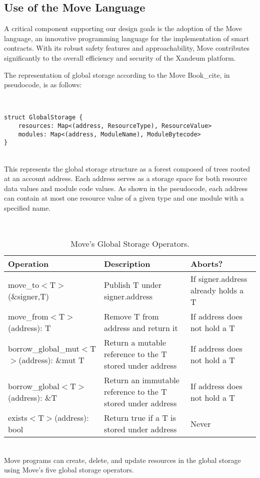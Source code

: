 \documentclass[11pt]{article}   	%
\begin{document}
\subsection{Use of the Move Language}
A critical component supporting our design goals is the adoption of the Move language, an innovative programming language for the implementation of smart contracts. With its robust safety features and approachability, Move contributes significantly to the overall efficiency and security of the Xandeum platform.

The representation of global storage according to the Move Book_{cite}, in pseudocode, is as follows:

\ \\
\begin{lstlisting}[caption=Global Storage in Move]
struct GlobalStorage {
    resources: Map<(address, ResourceType), ResourceValue>
    modules: Map<(address, ModuleName), ModuleBytecode>
}
\end{lstlisting}
\ \\

This represents the global storage structure as a forest composed of trees rooted at an account address. Each address serves as a storage space for both resource data values and module code values. As shown in the pseudocode, each address can contain at most one resource value of a given type and one module with a specified name.

\ \\
\phantom{~}
\begin{table}[!h]
\begin{center}
\begin{tabular}{p{}p{}p{}}
\hline
\textbf{Operation} & \textbf{Description} & \textbf{Aborts?} \\ \hline
move\_to$<$T$>$(\&signer,T) & Publish T under signer.address & If signer.address already holds a T \\ \hline
move\_from$<$T$>$(address): T & Remove T from address and return it & If address does not hold a T \\ \hline
borrow\_global\_mut$<$T$>$(address): \&mut T & Return a mutable reference to the T stored under address & If address does not hold a T \\ \hline
borrow\_global$<$T$>$(address): \&T & Return an immutable reference to the T stored under address & If address does not hold a T \\ \hline
exists$<$T$>$(address): bool & Return true if a T is stored under address & Never \\ \hline
\end{tabular}
\caption{\label{movesto}Move's Global Storage Operators.}
\end{center}
\end{table}
\ \\
Move programs can create, delete, and update resources in the global storage using Move's five global storage operators.
\end{document}
